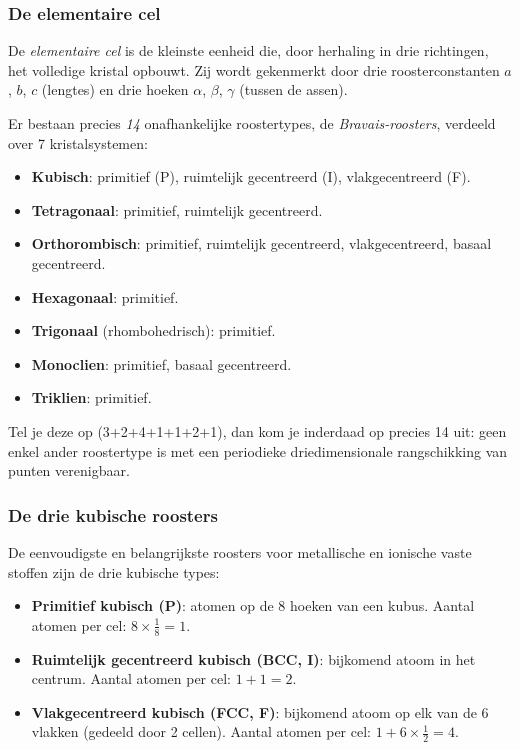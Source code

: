 \subsubsection{De elementaire cel}

De \emph{elementaire cel} is de kleinste eenheid die, door herhaling in drie richtingen, het volledige kristal opbouwt. Zij wordt gekenmerkt door drie roosterconstanten $a$, $b$, $c$ (lengtes) en drie hoeken $\alpha$, $\beta$, $\gamma$ (tussen de assen).

Er bestaan precies \emph{14} onafhankelijke roostertypes, de \emph{Bravais-roosters}, verdeeld over 7 kristalsystemen:
\begin{itemize}
\item \textbf{Kubisch}: primitief (P), ruimtelijk gecentreerd (I), vlakgecentreerd (F).
\item \textbf{Tetragonaal}: primitief, ruimtelijk gecentreerd.
\item \textbf{Orthorombisch}: primitief, ruimtelijk gecentreerd, vlakgecentreerd, basaal gecentreerd.
\item \textbf{Hexagonaal}: primitief.
\item \textbf{Trigonaal} (rhombohedrisch): primitief.
\item \textbf{Monoclien}: primitief, basaal gecentreerd.
\item \textbf{Triklien}: primitief.
\end{itemize}
Tel je deze op (3+2+4+1+1+2+1), dan kom je inderdaad op precies 14 uit: geen enkel ander roostertype is met een periodieke driedimensionale rangschikking van punten verenigbaar.

\subsubsection{De drie kubische roosters}

De eenvoudigste en belangrijkste roosters voor metallische en ionische vaste stoffen zijn de drie kubische types:

\begin{itemize}
\item \textbf{Primitief kubisch (P)}: atomen op de 8 hoeken van een kubus. Aantal atomen per cel: $8 \times \tfrac{1}{8} = 1$.
\item \textbf{Ruimtelijk gecentreerd kubisch (BCC, I)}: bijkomend atoom in het centrum. Aantal atomen per cel: $1 + 1 = 2$.
\item \textbf{Vlakgecentreerd kubisch (FCC, F)}: bijkomend atoom op elk van de 6 vlakken (gedeeld door 2 cellen). Aantal atomen per cel: $1 + 6 \times \tfrac{1}{2} = 4$.
\end{itemize}

